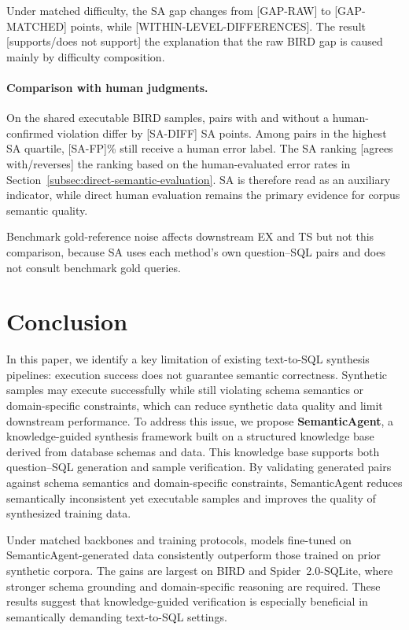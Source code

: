 \documentclass[letterpaper,journal]{IEEEtran}
\begin{document}
Under matched difficulty, the SA gap changes from [GAP-RAW] to [GAP-MATCHED] points, while [WITHIN-LEVEL-DIFFERENCES]. The result [supports/does not support] the explanation that the raw BIRD gap is caused mainly by difficulty composition.

\paragraph{Comparison with human judgments.}
On the shared executable BIRD samples, pairs with and without a human-confirmed violation differ by [SA-DIFF] SA points. Among pairs in the highest SA quartile, [SA-FP]\% still receive a human error label. The SA ranking [agrees with/reverses] the ranking based on the human-evaluated error rates in Section~\ref{subsec:direct-semantic-evaluation}. SA is therefore read as an auxiliary indicator, while direct human evaluation remains the primary evidence for corpus semantic quality.

Benchmark gold-reference noise affects downstream EX and TS but not this comparison, because SA uses each method's own question--SQL pairs and does not consult benchmark gold queries.

\section{Conclusion}

In this paper, we identify a key limitation of existing text-to-SQL synthesis pipelines: execution success does not guarantee semantic correctness. Synthetic samples may execute successfully while still violating schema semantics or domain-specific constraints, which can reduce synthetic data quality and limit downstream performance. To address this issue, we propose \textbf{SemanticAgent}, a knowledge-guided synthesis framework built on a structured knowledge base derived from database schemas and data. This knowledge base supports both question--SQL generation and sample verification. By validating generated pairs against schema semantics and domain-specific constraints, SemanticAgent reduces semantically inconsistent yet executable samples and improves the quality of synthesized training data.

Under matched backbones and training protocols, models fine-tuned on SemanticAgent-generated data consistently outperform those trained on prior synthetic corpora. The gains are largest on BIRD and Spider~2.0-SQLite, where stronger schema grounding and domain-specific reasoning are required. These results suggest that knowledge-guided verification is especially beneficial in semantically demanding text-to-SQL settings.
\end{document}
